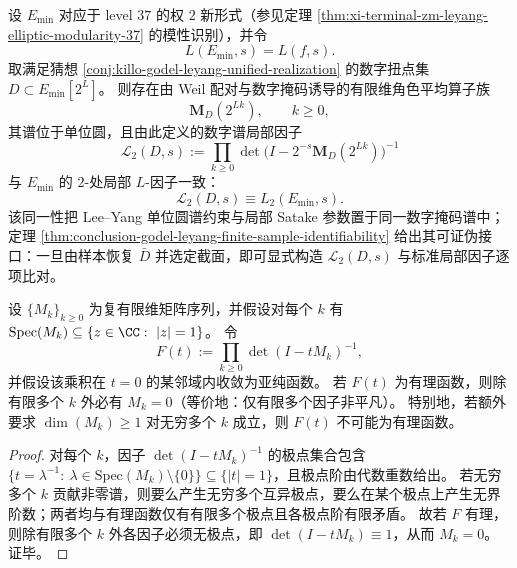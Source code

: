 \begin{conjecture}\label{conj:conclusion-godel-leyang-local-langlands-digital-spectrum}
设 \(E_{\min}\) 对应于 level \(37\) 的权 \(2\) 新形式（参见定理 \ref{thm:xi-terminal-zm-leyang-elliptic-modularity-37} 的模性识别），并令
\[
L(E_{\min},s)=L(f,s).
\]
取满足猜想 \ref{conj:killo-godel-leyang-unified-realization} 的数字扭点集 \(D\subset E_{\min}[2^L]\)。
则存在由 Weil 配对与数字掩码诱导的有限维角色平均算子族
\[
\mathbf M_D(2^{Lk}),\qquad k\ge 0,
\]
其谱位于单位圆，且由此定义的数字谱局部因子
\begin{equation}\label{eq:conclusion-godel-leyang-digital-local-factor}
\mathcal L_2(D,s):=
\prod_{k\ge 0}
\det\!\bigl(I-2^{-s}\mathbf M_D(2^{Lk})\bigr)^{-1}
\end{equation}
与 \(E_{\min}\) 的 \(2\)-处局部 \(L\)-因子一致：
\begin{equation}\label{eq:conclusion-godel-leyang-local-factor-identity}
\mathcal L_2(D,s)\equiv L_2(E_{\min},s).
\end{equation}
该同一性把 Lee--Yang 单位圆谱约束与局部 Satake 参数置于同一数字掩码谱中；定理 \ref{thm:conclusion-godel-leyang-finite-sample-identifiability} 给出其可证伪接口：一旦由样本恢复 \(\bar D\) 并选定截面，即可显式构造 \(\mathcal L_2(D,s)\) 与标准局部因子逐项比对。
\end{conjecture}

\begin{proposition}[单位圆谱无限乘积的有理性障碍]\label{prop:conclusion-digital-local-factor-rationality-obstruction}
设 \(\{M_k\}_{k\ge 0}\) 为复有限维矩阵序列，并假设对每个 \(k\) 有
\(
\mathrm{Spec}(M_k)\subseteq\{z\in\CC:\ |z|=1\}
\)。
令
\[
F(t):=\prod_{k\ge 0}\det(I-tM_k)^{-1},
\]
并假设该乘积在 \(t=0\) 的某邻域内收敛为亚纯函数。
若 \(F(t)\) 为有理函数，则除有限多个 \(k\) 外必有 \(M_k=0\)（等价地：仅有限多个因子非平凡）。
特别地，若额外要求 \(\dim(M_k)\ge 1\) 对无穷多个 \(k\) 成立，则 \(F(t)\) 不可能为有理函数。
\end{proposition}

\begin{proof}
对每个 \(k\)，因子 \(\det(I-tM_k)^{-1}\) 的极点集合包含 \(\{t=\lambda^{-1}:\ \lambda\in \mathrm{Spec}(M_k)\setminus\{0\}\}\subseteq\{|t|=1\}\)，且极点阶由代数重数给出。
若无穷多个 \(k\) 贡献非零谱，则要么产生无穷多个互异极点，要么在某个极点上产生无界阶数；两者均与有理函数仅有有限多个极点且各极点阶有限矛盾。
故若 \(F\) 有理，则除有限多个 \(k\) 外各因子必须无极点，即 \(\det(I-tM_k)\equiv 1\)，从而 \(M_k=0\)。证毕。
\end{proof}

